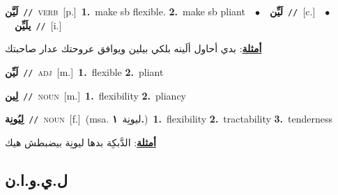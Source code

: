 \documentclass[10pt,a4paper,twoside]{article} %
\begin{document}
\begin{multicols}{2}
{\setlength\topsep{0pt}\textbf{\foreignlanguage{arabic}{لَيَّن}}\ {\color{gray}\texttt{//}\color{black}}\ \textsc{verb}\ [p.]\ \textbf{1.}~make sb flexible.  \textbf{2.}~make sb pliant\ \ $\bullet$\ \ \setlength\topsep{0pt}\textbf{\foreignlanguage{arabic}{لَيِّن}}\ {\color{gray}\texttt{//}\color{black}}\ [c.]\ \ $\bullet$\ \ \setlength\topsep{0pt}\textbf{\foreignlanguage{arabic}{يلَيِّن}}\ {\color{gray}\texttt{//}\color{black}}\ [i.]\  \begin{flushright}\color{gray}\foreignlanguage{arabic}{\textbf{\underline{\foreignlanguage{arabic}{أمثلة}}}: بدي أحاول ألَينه بلكي بيلين ويوافق عروحتك عدار صاحبتك}\end{flushright}\color{black}} \vspace{2mm}

{\setlength\topsep{0pt}\textbf{\foreignlanguage{arabic}{لَيِّن}}\ {\color{gray}\texttt{//}\color{black}}\ \textsc{adj}\ [m.]\ \textbf{1.}~flexible  \textbf{2.}~pliant\ } \vspace{2mm}

{\setlength\topsep{0pt}\textbf{\foreignlanguage{arabic}{لِين}}\ {\color{gray}\texttt{//}\color{black}}\ \textsc{noun}\ [m.]\ \textbf{1.}~flexibility  \textbf{2.}~pliancy\ } \vspace{2mm}

{\setlength\topsep{0pt}\textbf{\foreignlanguage{arabic}{لِيُونِة}}\ {\color{gray}\texttt{//}\color{black}}\ \textsc{noun}\ [f.]\ \color{gray}(msa. \foreignlanguage{arabic}{ليونِة}~\foreignlanguage{arabic}{\textbf{١.}})\color{black}\ \textbf{1.}~flexibility  \textbf{2.}~tractability  \textbf{3.}~tenderness\  \begin{flushright}\color{gray}\foreignlanguage{arabic}{\textbf{\underline{\foreignlanguage{arabic}{أمثلة}}}: الدَّبكِة بدها ليونِة بيضبطش هيك}\end{flushright}\color{black}} \vspace{2mm}

\vspace{-3mm}
\subsection*{\color{blue}\foreignlanguage{arabic}{ل.ي.و.ا.ن}\color{blue}{ (ntws)}} 


\end{multicols}
\end{document}
